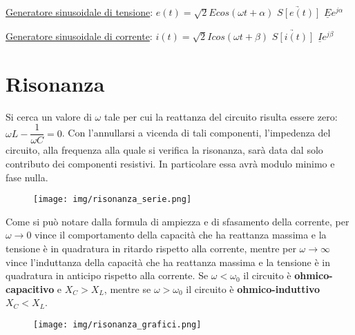 \documentclass{article}
\begin{document}
\noindent \underline{Generatore sinusoidale di tensione}: $e(t)=\sqrt{2}E cos(\omega t+ \alpha)$ \space $\underrightarrow{S[e(t)]}$ 
\space $\underline{E}e^{j\alpha}$

\noindent \underline{Generatore sinusoidale di corrente}: $i(t)=\sqrt{2}I cos(\omega t+ \beta)$ \space $\underrightarrow{S[i(t)]}$ 
\space $\underline{I} e^{j\beta}$
\pagebreak



\section{Risonanza}
\medskip

\noindent{}
\medskip

\noindent Si cerca un valore di $\omega$ tale per cui la reattanza del circuito risulta essere zero: $\omega L - \dfrac{1}{\omega C}=0$.
Con l'annullarsi a vicenda di tali componenti, l'impedenza del circuito, alla frequenza alla quale si verifica la risonanza, sarà data 
dal solo contributo dei componenti resistivi. In particolare essa avrà modulo minimo e fase nulla. 


\begin{figure}[h!]
    \begin{center}
        \texttt{[image: img/risonanza\_serie.png]}
    \end{center}
\end{figure}

\noindent Come si può notare dalla formula di ampiezza e di sfasamento della corrente, per $\omega\rightarrow0$ vince il comportamento
della capacità che ha reattanza massima e la tensione è in quadratura in ritardo rispetto alla corrente, mentre per $\omega\rightarrow\infty$
 vince l'induttanza della capacità che ha reattanza massima e la tensione è in quadratura in anticipo rispetto alla corrente.
 Se $\omega<\omega_0$ il circuito è \textbf{ohmico-capacitivo} e $X_C>X_L$, mentre se $\omega>\omega_0$  il circuito è \textbf{ohmico-induttivo}
 $X_C<X_L$.


\begin{figure}[h!]
    \begin{center}
        \texttt{[image: img/risonanza\_grafici.png]}
    \end{center}
\end{figure}
\end{document}
